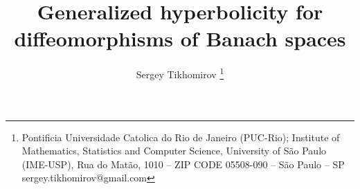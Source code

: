 \documentclass[12pt]{article}
\theoremstyle{definition}
\begin{document}
\title{Generalized hyperbolicity for diffeomorphisms of Banach spaces}

\author{ Sergey Tikhomirov 
\footnote{Pontificia Universidade Catolica do Rio de Janeiro (PUC-Rio); Institute of Mathematics, Statistics and Computer Science, University of São Paulo (IME-USP), Rua do Matão, 1010 – ZIP CODE 05508-090 – São Paulo – SP sergey.tikhomirov@gmail.com}
}

\date{}

\maketitle


%

\vspace{-29pt}
\end{document}
